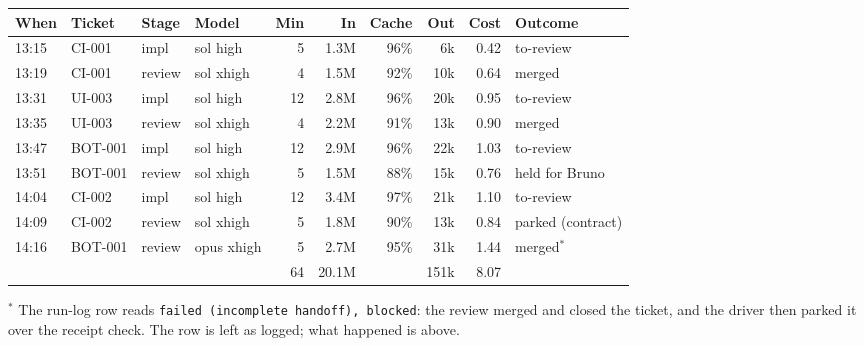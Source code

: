 \documentclass[11pt,a4paper]{article}
\begin{document}
{\small
\begin{tabularx}{\linewidth}{@{}llllrrrrrX@{}}
\toprule
When & Ticket & Stage & Model & Min & In & Cache & Out & Cost & Outcome \\
\midrule
13:15 & CI-001 & impl & sol high & 5 & 1.3M & 96\% & 6k & 0.42 & to-review \\
13:19 & CI-001 & review & sol xhigh & 4 & 1.5M & 92\% & 10k & 0.64 & merged \\
13:31 & UI-003 & impl & sol high & 12 & 2.8M & 96\% & 20k & 0.95 & to-review \\
13:35 & UI-003 & review & sol xhigh & 4 & 2.2M & 91\% & 13k & 0.90 & merged \\
13:47 & BOT-001 & impl & sol high & 12 & 2.9M & 96\% & 22k & 1.03 & to-review \\
13:51 & BOT-001 & review & sol xhigh & 5 & 1.5M & 88\% & 15k & 0.76 & held for Bruno \\
14:04 & CI-002 & impl & sol high & 12 & 3.4M & 97\% & 21k & 1.10 & to-review \\
14:09 & CI-002 & review & sol xhigh & 5 & 1.8M & 90\% & 13k & 0.84 & parked (contract) \\
14:16 & BOT-001 & review & opus xhigh & 5 & 2.7M & 95\% & 31k & 1.44 & merged$^{*}$ \\
\midrule
 & & & & 64 & 20.1M & & 151k & 8.07 & \\
\bottomrule
\end{tabularx}
}

\smallskip
{\small $^{*}$ The run-log row reads \texttt{failed (incomplete handoff), blocked}: the review
merged and closed the ticket, and the driver then parked it over the receipt check. The row
is left as logged; what happened is above.}

\begin{center}
\end{center}
\end{document}
